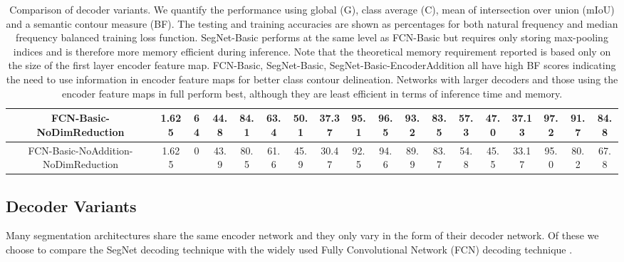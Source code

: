 \documentclass[10pt,journal,compsoc]{IEEEtran}
\begin{document}
\begin{table*}[t]
\begin{tabular}{c|c|c|c|cccc|ccc|cccc|ccc}
FCN-Basic-NoDimReduction                    &1.625 & 64 & 44.8  &  \textbf{84.1}     &  63.4       &   \textbf{50.1}    &37.37      & \textbf{95.1} & \textbf{96.5}  &  \textbf{93.2} &        83.5 & \textbf{57.3} & 47.0 & 37.13 &\textbf{97.2} & \textbf{91.7} & \textbf{84.8}
\\ \hline
FCN-Basic-NoAddition-NoDimReduction                    &1.625 & 0 & 43.9   & 80.5      &   61.6        & 45.9 & 30.47 &  92.5 & 94.6 & 89.9 &  83.7 & 54.8 & 45.5 & 33.17 & 95.0 & 80.2 & 67.8      \\ \hline 
\end{tabular}
\vspace*{0.1cm}
\caption{\footnotesize{Comparison of decoder variants. We quantify the performance using global (G), class average (C), mean of intersection over union (mIoU) and a semantic contour measure (BF). The testing and training accuracies are shown as percentages for both natural frequency and median frequency balanced training loss function. SegNet-Basic performs at the same level as FCN-Basic but requires only storing max-pooling indices and is therefore more memory efficient during inference. Note that the theoretical memory requirement reported is based only on the size of the first layer encoder feature map. FCN-Basic, SegNet-Basic, SegNet-Basic-EncoderAddition all have high BF scores indicating the need to use information in encoder feature maps for better class contour delineation. Networks with larger decoders and those using the encoder feature maps in full perform best, although they are least efficient in terms of inference time and memory.}}
\label{PoolingQuantCAFFE}
\end{table*}

\subsection{Decoder Variants}
\label{Variants}
Many segmentation architectures \cite{FCN, noh2015learning, liang2015semantic} share the same encoder network and they only vary in the form of their decoder network. 
Of these we choose to compare the SegNet decoding technique with the widely used Fully Convolutional Network (FCN) decoding technique \cite{FCN, zheng2015conditional}. 
\end{document}
